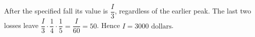 After the specified fall its value is $\dfrac{I}{3}$, regardless of the earlier peak. The last two losses leave $\dfrac{I}{3}\cdot\dfrac{1}{4}\cdot\dfrac{1}{5}=\dfrac{I}{60}=50$. Hence $\boxed{I=3000\text{ dollars}}$.
